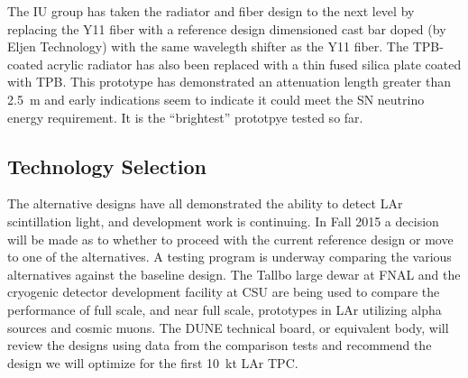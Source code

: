 The IU group has taken the radiator and fiber design to the next level
by replacing the Y11 fiber with a reference design dimensioned cast
bar doped (by Eljen Technology) with the same wavelegth shifter as the
Y11 fiber. The TPB-coated acrylic radiator has also been replaced with
a thin fused silica plate coated with TPB. This prototype has
demonstrated an attenuation length greater than 2.5~m and early
indications seem to indicate it could meet the SN neutrino energy
requirement. It is the ``brightest'' prototpye tested so far. 

\subsection{Technology Selection}

The alternative designs have all demonstrated the ability to detect
LAr scintillation light, and development work is continuing. In Fall
2015 a decision will be made as to whether to proceed with the current
reference design or move to one of the alternatives. A testing program
is underway comparing the various alternatives against the baseline
design. The Tallbo large dewar at FNAL and the cryogenic detector
development facility at CSU are being used to compare the performance
of full scale, and near full scale, prototypes in LAr utilizing alpha
sources and cosmic muons. The DUNE technical board, or equivalent
body, will review the designs using data from the comparison tests and
recommend the design we will optimize for the first 10~kt LAr TPC.
